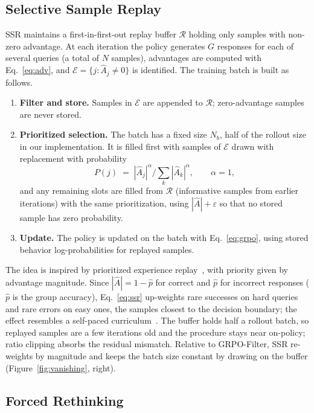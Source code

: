\documentclass{article}
\begin{document}
\subsection{Selective Sample Replay}
\label{sec:ssr}

SSR maintains a first-in-first-out replay buffer $\mathcal{R}$ holding only samples with non-zero advantage. At each iteration the policy generates $G$ responses for each of several queries (a total of $N$ samples), advantages are computed with Eq.~\eqref{eq:adv}, and $\mathcal{E}=\{j: \hat A_j\neq 0\}$ is identified. The training batch is built as follows.
\begin{enumerate}[leftmargin=*,itemsep=1pt,topsep=2pt]
\item \textbf{Filter and store.} Samples in $\mathcal{E}$ are appended to $\mathcal{R}$; zero-advantage samples are never stored.
\item \textbf{Prioritized selection.} The batch has a fixed size $N_b$, half of the rollout size in our implementation. It is filled first with samples of $\mathcal{E}$ drawn with replacement with probability
\begin{equation}
P(j)\;=\;|\hat A_j|^{\alpha}\Big/\textstyle\sum_{k}|\hat A_k|^{\alpha},\qquad \alpha=1,
\label{eq:ssr}
\end{equation}
and any remaining slots are filled from $\mathcal{R}$ (informative samples from earlier iterations) with the same prioritization, using $|\hat A|+\varepsilon$ so that no stored sample has zero probability.
\item \textbf{Update.} The policy is updated on the batch with Eq.~\eqref{eq:grpo}, using stored behavior log-probabilities for replayed samples.
\end{enumerate}
The idea is inspired by prioritized experience replay~\citep{per}, with priority given by advantage magnitude. Since $|\hat A|=1-\hat p$ for correct and $\hat p$ for incorrect responses ($\hat p$ is the group accuracy), Eq.~\eqref{eq:ssr} up-weights rare successes on hard queries and rare errors on easy ones, the samples closest to the decision boundary; the effect resembles a self-paced curriculum~\citep{curriculum}. The buffer holds half a rollout batch, so replayed samples are a few iterations old and the procedure stays near on-policy; ratio clipping absorbs the residual mismatch. Relative to GRPO-Filter, SSR re-weights by magnitude and keeps the batch size constant by drawing on the buffer (Figure~\ref{fig:vanishing}, right).

\subsection{Forced Rethinking}
\label{sec:fr}
\end{document}
